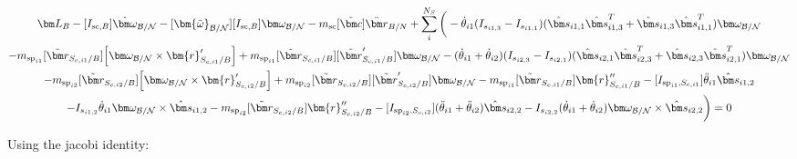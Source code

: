 \documentclass[paper]{aiaaNew}
\begin{document}
\begin{multline}
\bm L_B -[I_{\text{sc},B}] \dot{\bm\omega}_{\cal B/N} -[\bm{\tilde{\omega}}_{\cal B/N}] [I_{\text{sc},B}] \bm\omega_{\cal B/N} 
- m_{\text{sc}} [\tilde{\bm c}] \ddot{\bm r}_{B/N} 
+ \sum\limits_{i}^{N_S}\bigg( -\dot{\theta}_{i1} (I_{s_{i1,3}} - I_{s_{i1,1}})( \hat{\bm s}_{i1,1} \hat{\bm s}_{i1,3}^T + \hat{\bm s}_{i1,3} \hat{\bm s}_{i1,1}^T) \bm \omega_{\cal{B/N}} \\
- m_{\text{sp}_{i1}} [\tilde{{\bm r}}_{S_{c,i1}/B}] \Big[\bm\omega_{\cal B/N} \times \bm{r}'_{S_{c,i1}/B}\Big] + m_{\text{sp}_{i1}} [\tilde{{\bm r}}_{S_{c,i1}/B}] [\tilde{{\bm r}}'_{S_{c,i1}/B}] \bm\omega_{\cal B/N} -(\dot{\theta}_{i1}  + \dot{\theta}_{i2})(I_{s_{i2,3}} - I_{s_{i2,1}}) (\hat{\bm s}_{i2,1} \hat{\bm s}_{i2,3}^T + \hat{\bm s}_{i2,3} \hat{\bm s}_{i2,1}^T) \bm \omega_{\cal{B/N}} 
\\
- m_{\text{sp}_{i2}} [\tilde{{\bm r}}_{S_{c,i2}/B}] \Big[ \bm\omega_{\cal B/N} \times \bm{r}'_{S_{c,i2}/B}\Big]+  m_{\text{sp}_{i2}} [\tilde{{\bm r}}_{S_{c,i2}/B}] [\tilde{{\bm r}}'_{S_{c,i2}/B}] \bm\omega_{\cal B/N}
- m_{\text{sp}_{i1}} [\tilde{{\bm r}}_{S_{c,i1}/B}] \bm{r}''_{S_{c,i1}/B} 
-[I_{\text{sp}_{i1},S_{c,i1}}] \ddot{\theta}_{i1} \hat{\bm s}_{i1,2} 
\\
-I_{s_{i1,2}} \dot{\theta}_{i1} \bm \omega_{\cal{B/N}} \times \hat{\bm s}_{i1,2}
- m_{\text{sp}_{i2}} [\tilde{{\bm r}}_{S_{c,i2}/B}] \bm{r}''_{S_{c,i2}/B}
-[I_{\text{sp}_{i2},S_{c,i2}}] (\ddot{\theta}_{i1}  + \ddot{\theta}_{i2})\hat{\bm s}_{i2,2} 
-I_{s_{i2,2}}  (\dot{\theta}_{i1}  + \dot{\theta}_{i2}) \bm \omega_{\cal{B/N}} \times \hat{\bm s}_{i2,2} \bigg) = 0
\end{multline}

Using the jacobi identity:
\end{document}
